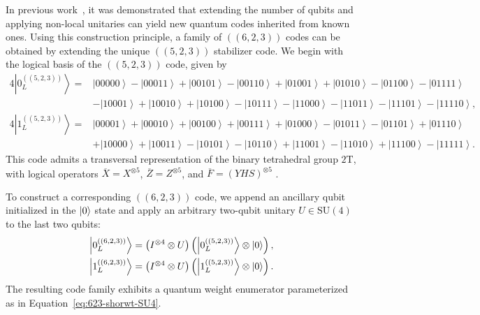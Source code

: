 \documentclass[8pt]{article}
\theoremstyle{definition}
\begin{document}
In previous work~\cite{Cao_2022}, it was demonstrated that extending the number of qubits and applying non-local unitaries can yield new quantum codes inherited from known ones. Using this construction principle, a family of \(((6,2,3))\) codes can be obtained by extending the unique \(((5,2,3))\) stabilizer code. We begin with the logical basis of the \(((5,2,3))\) code, given by
\begin{align*}
    4\left|0^{((5,2,3))}_{L}\right\rangle  = & \left|00000\right\rangle -\left|00011\right\rangle +\left|00101\right\rangle -\left|00110\right\rangle +\left|01001\right\rangle +\left|01010\right\rangle -\left|01100\right\rangle -\left|01111\right\rangle \\&-\left|10001\right\rangle +\left|10010\right\rangle +\left|10100\right\rangle -\left|10111\right\rangle -\left|11000\right\rangle -\left|11011\right\rangle -\left|11101\right\rangle -\left|11110\right\rangle,\\
    4\left|1^{((5,2,3))}_{L}\right\rangle  = & \left|00001\right\rangle +\left|00010\right\rangle +\left|00100\right\rangle +\left|00111\right\rangle +\left|01000\right\rangle -\left|01011\right\rangle -\left|01101\right\rangle +\left|01110\right\rangle \\&+\left|10000\right\rangle +\left|10011\right\rangle -\left|10101\right\rangle -\left|10110\right\rangle +\left|11001\right\rangle -\left|11010\right\rangle +\left|11100\right\rangle -\left|11111\right\rangle .
\end{align*}
This code admits a transversal representation of the binary tetrahedral group \(2\mathrm{T}\), with logical operators \(\overline{X} = X^{\otimes 5}\), \(\overline{Z} = Z^{\otimes 5}\), and \(\overline{F} = (YHS)^{\otimes 5}\) \cite{kubischta2023family}.

To construct a corresponding \(((6,2,3))\) code, we append an ancillary qubit initialized in the \(\ket{0}\) state and apply an arbitrary two-qubit unitary \(U \in \mathrm{SU}(4)\) to the last two qubits:
\begin{equation}\label{eq:623-from-523}
    \begin{aligned}
        \left|0^{((6,2,3))}_{L}\right\rangle & = \left(I^{\otimes 4} \otimes U\right)\left(\left|0^{((5,2,3))}_{L}\right\rangle \otimes \ket{0} \right), \\
        \left|1^{((6,2,3))}_{L}\right\rangle & = \left(I^{\otimes 4} \otimes U\right)\left(\left|1^{((5,2,3))}_{L}\right\rangle \otimes \ket{0} \right).
    \end{aligned}
\end{equation}
The resulting code family exhibits a quantum weight enumerator parameterized as in Equation~\eqref{eq:623-shorwt-SU4}.
\end{document}

